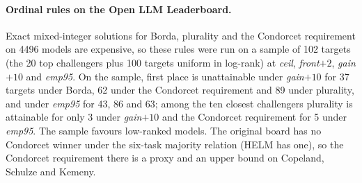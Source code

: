 \paragraph{Ordinal rules on the Open LLM Leaderboard.}
Exact mixed-integer solutions for Borda, plurality and the Condorcet requirement on 4496 models are expensive, so these rules were run on a sample of 102 targets (the 20 top challengers plus 100 targets uniform in log-rank) at \emph{ceil}, \emph{front}$+2$, \emph{gain}$+10$ and \emph{emp95}. On the sample, first place is unattainable under \emph{gain}$+10$ for 37 targets under Borda, 62 under the Condorcet requirement and 89 under plurality, and under \emph{emp95} for 43, 86 and 63; among the ten closest challengers plurality is attainable for only 3 under \emph{gain}$+10$ and the Condorcet requirement for 5 under \emph{emp95}. The sample favours low-ranked models. The original board has no Condorcet winner under the six-task majority relation (HELM has one), so the Condorcet requirement there is a proxy and an upper bound on Copeland, Schulze and Kemeny.
